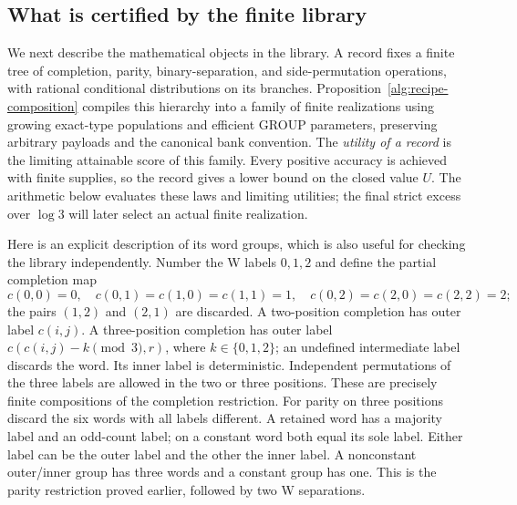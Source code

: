 \documentclass[11pt]{article}
\numberwithin{equation}{section}
\theoremstyle{definition}
\theoremstyle{remark}
\begin{document}
\subsection{What is certified by the finite library}

We next describe the mathematical objects in the library.  A record fixes a
finite tree of completion, parity, binary-separation, and side-permutation
operations, with rational conditional distributions on its branches.
Proposition~\ref{alg:recipe-composition} compiles this hierarchy into a family
of finite realizations using growing exact-type populations and efficient
GROUP parameters,
preserving arbitrary payloads and the canonical bank convention.  The
\emph{utility of a record} is the limiting attainable score of this family.
Every positive accuracy is achieved with finite supplies, so the record
gives a lower bound on the closed value $U$.  The arithmetic below evaluates
these laws and limiting utilities; the final strict excess over $\log3$
will later select an actual finite realization.

Here is an explicit description of its word groups, which is also useful
for checking the library independently.  Number the W labels $0,1,2$ and
define the partial completion map
\[
 c(0,0)=0,\quad c(0,1)=c(1,0)=c(1,1)=1,\quad
 c(0,2)=c(2,0)=c(2,2)=2;
\]
the pairs $(1,2)$ and $(2,1)$ are discarded.  A two-position completion
has outer label $c(i,j)$.  A three-position completion has outer label
$c(c(i,j)-k\pmod3,r)$, where $k\in\{0,1,2\}$; an undefined intermediate
label discards the word.  Its inner label is deterministic.  Independent
permutations of the three labels are allowed in the two or three positions.
These are precisely finite compositions of the completion restriction.
For parity on three positions discard the six words with all labels
different.  A retained word has a majority label and an odd-count label;
on a constant word both equal its sole label.  Either label can be the
outer label and the other the inner label.  A nonconstant outer/inner
group has three words and a constant group has one.  This is the parity
restriction proved earlier, followed by two W separations.
\end{document}
